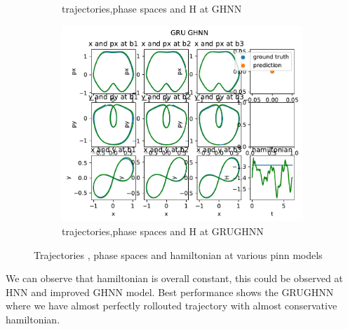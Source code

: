 \begin{figure}[H]
\begin{subfigure}[b]{0.3\textwidth}
		\caption{trajectories,phase spaces and H at GHNN}
		\label{fig:image5}
	\end{subfigure}
	\hfill
	\begin{subfigure}[b]{0.3\textwidth}
		\centering
		\includegraphics[width=\textwidth]{chapters/chapter5/figonly_grughnn_traj.pdf}
		\caption{trajectories,phase spaces and H at GRUGHNN}
		\label{fig:image6}
	\end{subfigure}
	
	\caption{Trajectories , phase spaces and hamiltonian at various pinn models}
	\label{div_traj}
\end{figure}

We can observe that hamiltonian is overall constant, this could be observed at HNN and improved GHNN model. Best performance shows the GRUGHNN where we have almost perfectly rollouted trajectory with almost conservative hamiltonian.


